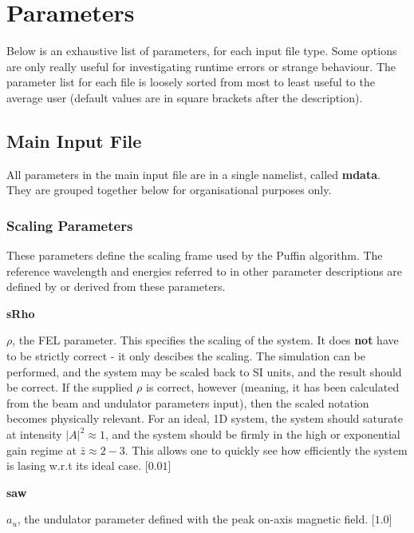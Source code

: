 \documentclass[12pt]{article}%
\begin{document}
\newpage

\section{Parameters}


Below is an exhaustive list of parameters, for each input file type. Some options are only really useful for investigating runtime errors or strange behaviour. The parameter list for each file is loosely sorted from most to least useful to the average user (default values are in square brackets after the description).


\subsection{Main Input File}


All parameters in the main input file are in a single namelist, called {\bf mdata}. They are grouped together below for organisational purposes only.

\subsubsection{Scaling Parameters}

These parameters define the scaling frame used by the Puffin algorithm. The reference wavelength and energies referred to in other parameter descriptions are defined by or derived from these parameters.

{\bf sRho}

$\rho$, the FEL parameter. This specifies the scaling of the system. It does {\bf not} have to be strictly correct - it only descibes the scaling. The simulation can be performed, and the system may be scaled back to SI units, and the result should be correct. If the supplied $\rho$ is correct, however (meaning, it has been calculated from the beam and undulator parameters input), then the scaled notation becomes physically relevant. For an ideal, 1D system, the system should saturate at intensity $|A|^2 \approx 1$, and the system should be firmly in the high or exponential gain regime at $\bar{z} \approx 2-3$. This allows one to quickly see how efficiently the system is lasing w.r.t its ideal case. [$0.01$]

{\bf saw}

$a_u$, the undulator parameter defined with the peak on-axis magnetic field. [$1.0$]
\end{document}
